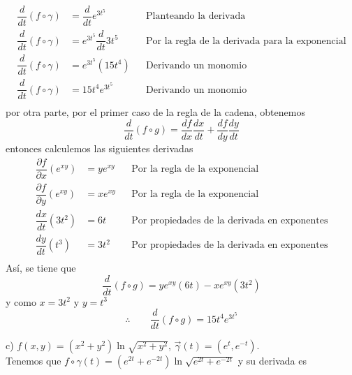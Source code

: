 \documentclass[letterpaper]{article}
\renewcommand{\d}{\partial}
\renewcommand{\*}{\cdot}
\theoremstyle{definition}
\begin{document}
\begin{align*}
	\dfrac{d}{dt} (f\circ \gamma) &= \dfrac{d}{dt} e^{3t^5} &&\text{Planteando la derivada}\\
	\dfrac{d}{dt} (f\circ \gamma) &= e^{3t^5}\dfrac{d}{dt} 3t^5 &&\text{Por la regla de la derivada para la exponencial}\\
	\dfrac{d}{dt} (f\circ \gamma) &= e^{3t^5}(15t^4) &&\text{Derivando un monomio}\\
	\dfrac{d}{dt} (f\circ \gamma) &= 15t^4e^{3t^5} &&\text{Derivando un monomio}\\
\end{align*}
por otra parte, por el primer caso de la regla de la cadena, obtenemos
\[ 	\dfrac{d}{dt}(f\circ g) = 	\dfrac{df}{dx}\dfrac{dx}{dt} + \dfrac{df}{dy}\dfrac{dy}{dt} \]
entonces calculemos las siguientes derivadas
\begin{align*}
	\dfrac{\d f}{\d x}(e^{xy}) &= ye^{xy} &&\text{Por la regla de la exponencial}\\
	\dfrac{\d f}{\d y}(e^{xy}) &= xe^{xy} &&\text{Por la regla de la exponencial}\\
	\dfrac{dx}{dt}(3t^2) &= 6t &&\text{Por propiedades de la derivada en exponentes}\\
	\dfrac{dy}{dt}(t^3) &= 3t^2 &&\text{Por propiedades de la derivada en exponentes}\\
\end{align*}
Así, se tiene que 
\[ \dfrac{d}{dt}(f\circ g) = ye^{xy}(6t) - xe^{xy}(3t^2) \] y como $ x = 3t^2 $ y $ y = t^3 $
\[ \therefore  \qquad \dfrac{d}{dt}(f\circ g) = 15t^4e^{3t^5} \]

c) $f(x,y) = (x^2 + y^2)\ln{\sqrt{x^2 + y^2}}$, $\vec{\gamma}(t) =(e^t, e^{-t}) $.\\

Tenemos que $  f \circ \gamma(t) = (e^{2t} + e^{-2t})\ln \sqrt{e^{2t} + e^{-2t}}  $ y su derivada es 
\end{document}
